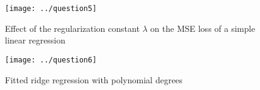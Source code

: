 \documentclass[11pt,english]{article}
\begin{document}
	\begin{figure}[h!]
		\centering
		\texttt{[image: ../question5]}
		\caption[Question 5]{Effect of the regularization constant $\lambda$ on the MSE loss of a simple linear regression}
		\label{fig:question5}
	\end{figure}
		
	\begin{figure}[h!]
		\centering
		\texttt{[image: ../question6]}
		\caption[Question 6]{Fitted ridge regression with polynomial degrees}
		\label{fig:question6}
	\end{figure}
\end{document}
